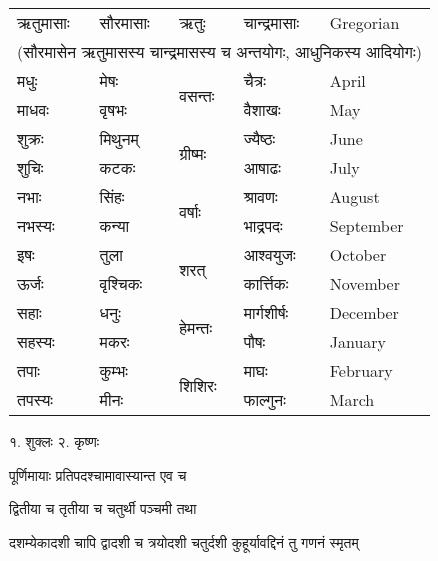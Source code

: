 \begin{longtable}{lllll}
  ऋतुमासाः & सौरमासाः & ऋतुः    & चान्द्रमासाः & \textsf{\normalsize Gregorian} \\
  \multicolumn{5}{c}{\small (सौरमासेन ऋतुमासस्य चान्द्रमासस्य च अन्तयोगः, आधुनिकस्य आदियोगः)}\\\hline\endhead
  मधुः     & मेषः      & \multirow{2}{*}{वसन्तः}  & चैत्रः       & \textsf{\normalsize April}     \\*
  माधवः   & वृषभः     &   & वैशाखः      & \textsf{\normalsize May}       \\\hline
  शुक्रः    & मिथुनम्    & \multirow{2}{*}{ग्रीष्मः} & ज्यैष्ठः      & \textsf{\normalsize June}      \\*
  शुचिः    & कटकः     &  & आषाढः      & \textsf{\normalsize July}      \\\hline
  नभाः    & सिंहः     & \multirow{2}{*}{वर्षाः}  & श्रावणः     & \textsf{\normalsize August}    \\*
  नभस्यः   & कन्या     &   & भाद्रपदः    & \textsf{\normalsize September} \\\hline
  इषः     & तुला      & \multirow{2}{*}{शरत्}    & आश्वयुजः     & \textsf{\normalsize October}   \\*
  ऊर्जः    & वृश्चिकः   &     & कार्त्तिकः   & \textsf{\normalsize November}  \\\hline
  सहाः    & धनुः      & \multirow{2}{*}{हेमन्तः}  & मार्गशीर्षः  & \textsf{\normalsize December}  \\*
  सहस्यः   & मकरः     &   & पौषः       & \textsf{\normalsize January}   \\\hline
  तपाः    & कुम्भः     & \multirow{2}{*}{शिशिरः} & माघः       & \textsf{\normalsize February}  \\*
  तपस्यः   & मीनः     &  & फाल्गुनः     & \textsf{\normalsize March}     \\\hline
\end{longtable}


१. शुक्लः \hspace{2em} २. कृष्णः


{पूर्णिमायाः प्रतिपदश्चामावास्यान्त एव च}

{द्वितीया च तृतीया च चतुर्थी पञ्चमी तथा}

{दशम्येकादशी चापि द्वादशी च त्रयोदशी}
{चतुर्दशी कुहूर्यावद्दिनं तु गणनं स्मृतम्}

